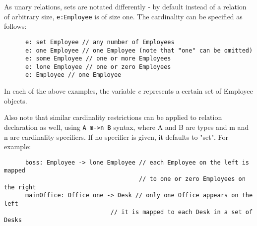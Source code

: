 \documentclass[10pt]{article}
\begin{document}
    As unary relations, sets are notated differently - by default instead of a relation of arbitrary size, \lstinline|e:Employee| is of size one. The cardinality can be specified as follows:
    \begin{lstlisting}
      e: set Employee // any number of Employees
      e: one Employee // one Employee (note that "one" can be omitted)
      e: some Employee // one or more Employees
      e: lone Employee // one or zero Employees
      e: Employee // one Employee
    \end{lstlisting} \par
    In each of the above examples, the variable \textit{e} represents a certain set of Employee objects.\par
    Also note that similar cardinality restrictions can be applied to relation declaration as well, using \lstinline|A m->n B| syntax, where A and B are types and m and n are cardinality specifiers. If no specifier is given, it defaults to "set". For example:
    \begin{lstlisting}
      boss: Employee -> lone Employee // each Employee on the left is mapped
                                      // to one or zero Employees on the right
      mainOffice: Office one -> Desk // only one Office appears on the left
                              // it is mapped to each Desk in a set of Desks
    \end{lstlisting} \par
\end{document}
